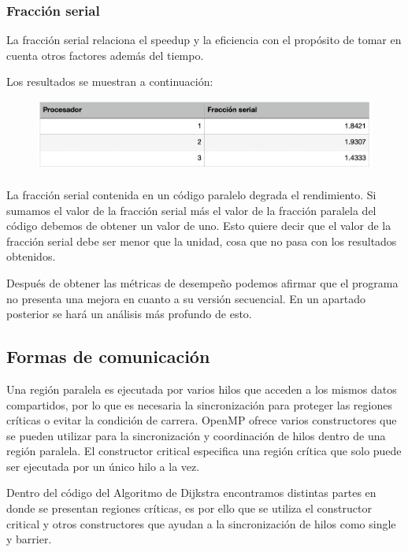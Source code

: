 \documentclass[11pt]{article}
\begin{document}
\subsubsection{Fracción serial}
La fracción serial relaciona el speedup y la eficiencia con el propósito de tomar en cuenta otros factores además del tiempo.
\par
Los resultados se muestran a continuación:

\begin{figure}[!htbp]
\centering
\includegraphics[width=1\linewidth]{fraccion}
\end{figure}

\paragraph{}
La fracción serial contenida en un código paralelo degrada el rendimiento. Si sumamos el valor de la fracción serial más el valor de la fracción paralela del código debemos de obtener un valor de uno. Esto quiere decir que el valor de la fracción serial debe ser menor que la unidad, cosa que no pasa con los resultados obtenidos.
\par
Después de obtener las métricas de desempeño podemos afirmar que el programa no presenta una mejora en cuanto a su versión secuencial. En un apartado posterior se hará un análisis más profundo de esto. 


\subsection{Formas de comunicación}
Una región paralela es ejecutada por varios hilos que acceden a los mismos datos compartidos, por lo que es necesaria la sincronización para proteger las regiones críticas o evitar la condición de carrera. OpenMP ofrece varios constructores que se pueden utilizar para la sincronización y coordinación de hilos dentro de una región paralela. El constructor critical especifica una región crítica que solo puede ser ejecutada por un único hilo a la vez. 
\par
Dentro del código del Algoritmo de Dijkstra encontramos distintas partes en donde se presentan regiones críticas, es por ello que se utiliza el constructor critical y otros constructores que ayudan a la sincronización de hilos como single y barrier.
\end{document}
